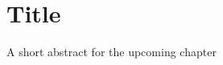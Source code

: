 \chapter{Title}
\label{chap:intro}
\begin{shortAbstract}
A short abstract for the upcoming chapter
\end{shortAbstract}

